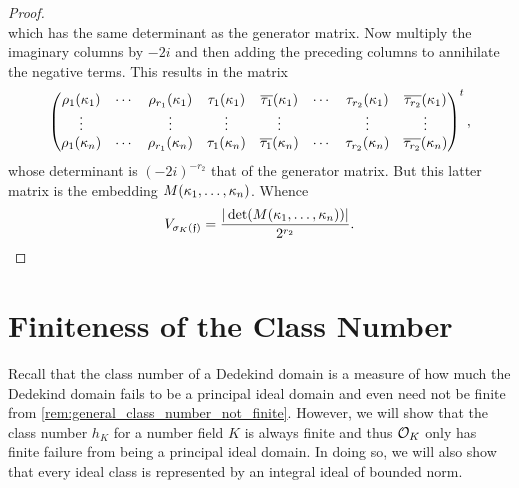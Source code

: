 \begin{proof}
\[      \]
      which has the same determinant as the generator matrix. Now multiply the imaginary columns by \(-2i\) and then adding the preceding columns to annihilate the negative terms. This results in the matrix
      \[
        \begin{pmatrix} \rho_{1}(\kappa_{1}) & \cdots & \rho_{r_{1}}(\kappa_{1}) & \tau_{1}(\kappa_{1}) &\overline{\tau_{1}}(\kappa_{1}) & \cdots & \tau_{r_{2}}(\kappa_{1}) & \overline{\tau_{r_{2}}}(\kappa_{1}) \\ \vdots & & \vdots & \vdots & \vdots & & \vdots & \vdots \\ \rho_{1}(\kappa_{n}) & \cdots & \rho_{r_{1}}(\kappa_{n}) & \tau_{1}(\kappa_{n}) & \overline{\tau_{1}}(\kappa_{n}) & \cdots & \tau_{r_{2}}(\kappa_{n}) & \overline{\tau_{r_{2}}}(\kappa_{n}) \end{pmatrix}^{t},
      \]
      whose determinant is \((-2i)^{-r_{2}}\) that of the generator matrix. But this latter matrix is the embedding \(M(\kappa_{1},\ldots,\kappa_{n})\). Whence
      \[
        V_{\sigma_{K}(\mathfrak{f})} = \frac{|\det(M(\kappa_{1},\ldots,\kappa_{n}))|}{2^{r_{2}}}.
      \]
    \end{proof}
  \section{Finiteness of the Class Number}
    Recall that the class number of a Dedekind domain is a measure of how much the Dedekind domain fails to be a principal ideal domain and even need not be finite from \cref{rem:general_class_number_not_finite}. However, we will show that the class number \(h_{K}\) for a number field \(K\) is always finite and thus \(\mathcal{O}_{K}\) only has finite failure from being a principal ideal domain. In doing so, we will also show that every ideal class is represented by an integral ideal of bounded norm.

